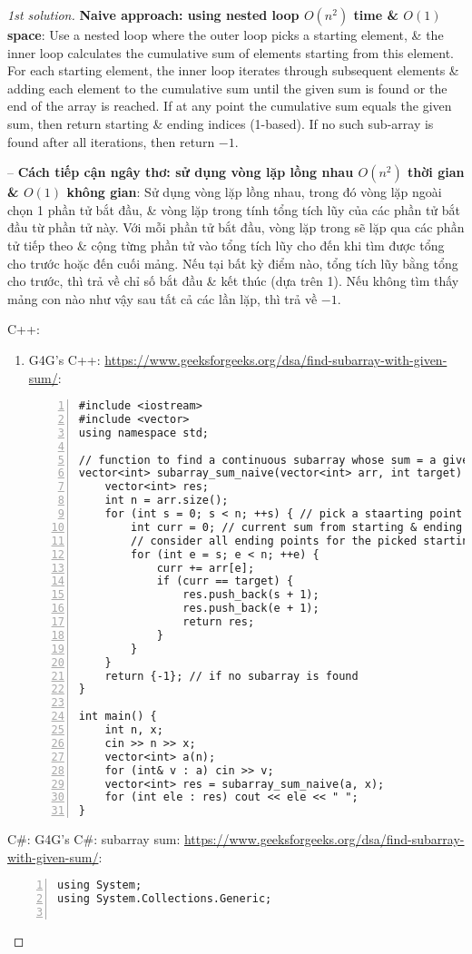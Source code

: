 \documentclass{article}
\begin{document}
\begin{proof}[1st solution]
    {\bf Naive approach: using nested loop $O(n^2)$ time \& $O(1)$ space}: Use a nested loop where the outer loop picks a starting element, \& the inner loop calculates the cumulative sum of elements starting from this element. For each starting element, the inner loop iterates through subsequent elements \& adding each element to the cumulative sum until the given sum is found or the end of the array is reached. If at any point the cumulative sum equals the given sum, then return starting \& ending indices (1-based). If no such sub-array is found after all iterations, then return $-1$.

    -- {\bf Cách tiếp cận ngây thơ: sử dụng vòng lặp lồng nhau $O(n^2)$ thời gian \& $O(1)$ không gian}: Sử dụng vòng lặp lồng nhau, trong đó vòng lặp ngoài chọn 1 phần tử bắt đầu, \& vòng lặp trong tính tổng tích lũy của các phần tử bắt đầu từ phần tử này. Với mỗi phần tử bắt đầu, vòng lặp trong sẽ lặp qua các phần tử tiếp theo \& cộng từng phần tử vào tổng tích lũy cho đến khi tìm được tổng cho trước hoặc đến cuối mảng. Nếu tại bất kỳ điểm nào, tổng tích lũy bằng tổng cho trước, thì trả về chỉ số bắt đầu \& kết thúc (dựa trên 1). Nếu không tìm thấy mảng con nào như vậy sau tất cả các lần lặp, thì trả về $-1$.

    C++:
    \begin{enumerate}
        \item G4G's C++: \url{https://www.geeksforgeeks.org/dsa/find-subarray-with-given-sum/}:
        \begin{Verbatim}[numbers=left,xleftmargin=5mm]
#include <iostream>
#include <vector>
using namespace std;

// function to find a continuous subarray whose sum = a given number
vector<int> subarray_sum_naive(vector<int> arr, int target) {
    vector<int> res;
    int n = arr.size();
    for (int s = 0; s < n; ++s) { // pick a staarting point for a subarray
        int curr = 0; // current sum from starting & ending indices
        // consider all ending points for the picked starting point
        for (int e = s; e < n; ++e) {
            curr += arr[e];
            if (curr == target) {
                res.push_back(s + 1);
                res.push_back(e + 1);
                return res;
            }
        }
    }
    return {-1}; // if no subarray is found
}

int main() {
    int n, x;
    cin >> n >> x;
    vector<int> a(n);
    for (int& v : a) cin >> v;
    vector<int> res = subarray_sum_naive(a, x);
    for (int ele : res) cout << ele << " ";
}
        \end{Verbatim}
    \end{enumerate}
    C\#: G4G's C\#: subarray sum: \url{https://www.geeksforgeeks.org/dsa/find-subarray-with-given-sum/}:
    \begin{Verbatim}[numbers=left,xleftmargin=5mm]
using System;
using System.Collections.Generic;


\end{Verbatim}
\end{proof}
\end{document}
